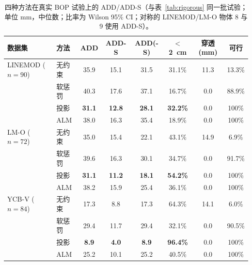 \begin{table}[t]
\centering
\caption{四种方法在真实 BOP 试验上的 ADD/ADD-S（与表~\ref{tab:rigorous} 同一批试验；单位 mm，中位数；比率为 Wilson 95\% CI；对称的 LINEMOD/LM-O 物体 8 与 9 使用 ADD-S）。}
\label{tab:add}
\scriptsize
\setlength{\tabcolsep}{4pt}
\begin{tabular}{@{}llcccccc@{}}
\toprule
数据集 & 方法 & ADD & ADD-S & ADD(-S) & $<$2~cm & 穿透 (mm) & 可行 \\
\midrule
LINEMOD ($n{=}90$) & 无约束 & 35.9 & 15.1 & 31.5 & 31.1\% & 11.3 & 13.3\% \\
 & 软惩罚 & 40.3 & 17.6 & 37.1 & 16.7\% & 0.0 & 88.9\% \\
 & 投影 & \textbf{31.1} & \textbf{12.8} & \textbf{28.1} & \textbf{32.2\%} & 0.0 & 100\% \\
 & ALM & 38.0 & 16.3 & 35.4 & 18.9\% & 0.0 & 100\% \\
LM-O ($n{=}72$) & 无约束 & 35.0 & 15.4 & 22.1 & 43.1\% & 14.9 & 6.9\% \\
 & 软惩罚 & 39.6 & 16.3 & 30.1 & 34.7\% & 0.0 & 91.7\% \\
 & 投影 & \textbf{31.1} & \textbf{11.2} & \textbf{18.1} & \textbf{54.2\%} & 0.0 & 100\% \\
 & ALM & 38.2 & 15.9 & 25.4 & 36.1\% & 0.0 & 100\% \\
YCB-V ($n{=}84$) & 无约束 & 17.3 & 8.8 & 17.3 & 64.3\% & 14.1 & 6.0\% \\
 & 软惩罚 & 29.4 & 11.7 & 29.4 & 32.1\% & 0.0 & 90.5\% \\
 & 投影 & \textbf{8.9} & \textbf{4.0} & \textbf{8.9} & \textbf{96.4\%} & 0.0 & 100\% \\
 & ALM & 25.2 & 10.1 & 25.2 & 40.5\% & 0.0 & 100\% \\
\bottomrule
\end{tabular}
\end{table}
